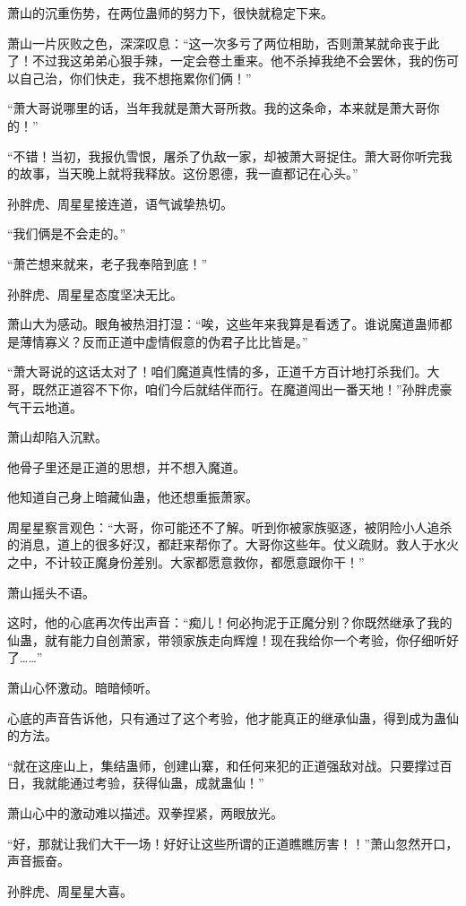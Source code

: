 \begin{this_body}
萧山的沉重伤势，在两位蛊师的努力下，很快就稳定下来。

萧山一片灰败之色，深深叹息：“这一次多亏了两位相助，否则萧某就命丧于此了！不过我这弟弟心狠手辣，一定会卷土重来。他不杀掉我绝不会罢休，我的伤可以自己治，你们快走，我不想拖累你们俩！”

“萧大哥说哪里的话，当年我就是萧大哥所救。我的这条命，本来就是萧大哥你的！”

“不错！当初，我报仇雪恨，屠杀了仇敌一家，却被萧大哥捉住。萧大哥你听完我的故事，当天晚上就将我释放。这份恩德，我一直都记在心头。”

孙胖虎、周星星接连道，语气诚挚热切。

“我们俩是不会走的。”

“萧芒想来就来，老子我奉陪到底！”

孙胖虎、周星星态度坚决无比。

萧山大为感动。眼角被热泪打湿：“唉，这些年来我算是看透了。谁说魔道蛊师都是薄情寡义？反而正道中虚情假意的伪君子比比皆是。”

“萧大哥说的这话太对了！咱们魔道真性情的多，正道千方百计地打杀我们。大哥，既然正道容不下你，咱们今后就结伴而行。在魔道闯出一番天地！”孙胖虎豪气干云地道。

萧山却陷入沉默。

他骨子里还是正道的思想，并不想入魔道。

他知道自己身上暗藏仙蛊，他还想重振萧家。

周星星察言观色：“大哥，你可能还不了解。听到你被家族驱逐，被阴险小人追杀的消息，道上的很多好汉，都赶来帮你了。大哥你这些年。仗义疏财。救人于水火之中，不计较正魔身份差别。大家都愿意救你，都愿意跟你干！”

萧山摇头不语。

这时，他的心底再次传出声音：“痴儿！何必拘泥于正魔分别？你既然继承了我的仙蛊，就有能力自创萧家，带领家族走向辉煌！现在我给你一个考验，你仔细听好了……”

萧山心怀激动。暗暗倾听。

心底的声音告诉他，只有通过了这个考验，他才能真正的继承仙蛊，得到成为蛊仙的方法。

“就在这座山上，集结蛊师，创建山寨，和任何来犯的正道强敌对战。只要撑过百日，我就能通过考验，获得仙蛊，成就蛊仙！”

萧山心中的激动难以描述。双拳捏紧，两眼放光。

“好，那就让我们大干一场！好好让这些所谓的正道瞧瞧厉害！！”萧山忽然开口，声音振奋。

孙胖虎、周星星大喜。


\end{this_body}

